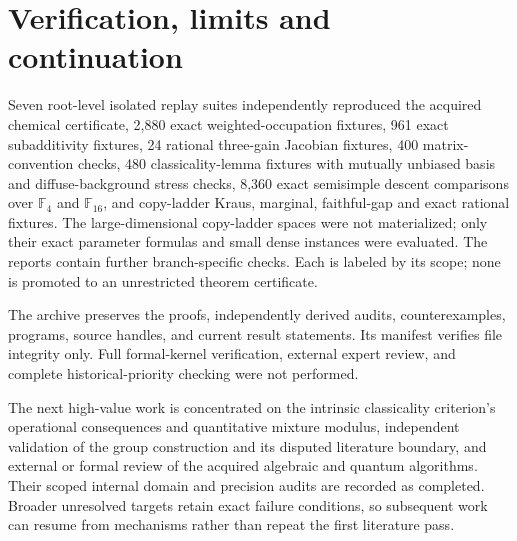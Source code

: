 \documentclass[11pt]{article}
\begin{document}
\section{Verification, limits and continuation}
Seven root-level isolated replay suites independently reproduced the acquired chemical certificate, 2,880 exact weighted-occupation fixtures, 961 exact subadditivity fixtures, 24 rational three-gain Jacobian fixtures, 400 matrix-convention checks, 480 classicality-lemma fixtures with mutually unbiased basis and diffuse-background stress checks, 8,360 exact semisimple descent comparisons over $\mathbb F_4$ and $\mathbb F_{16}$, and copy-ladder Kraus, marginal, faithful-gap and exact rational fixtures. The large-dimensional copy-ladder spaces were not materialized; only their exact parameter formulas and small dense instances were evaluated. The reports contain further branch-specific checks. Each is labeled by its scope; none is promoted to an unrestricted theorem certificate.

The archive preserves the proofs, independently derived audits, counterexamples, programs, source handles, and current result statements. Its manifest verifies file integrity only. Full formal-kernel verification, external expert review, and complete historical-priority checking were not performed.

The next high-value work is concentrated on the intrinsic classicality criterion's operational consequences and quantitative mixture modulus, independent validation of the group construction and its disputed literature boundary, and external or formal review of the acquired algebraic and quantum algorithms. Their scoped internal domain and precision audits are recorded as completed. Broader unresolved targets retain exact failure conditions, so subsequent work can resume from mechanisms rather than repeat the first literature pass.
\end{document}
